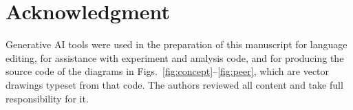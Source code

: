 \documentclass[lettersize,journal]{IEEEtran}
\begin{document}
\section*{Acknowledgment}
Generative AI tools were used in the preparation of this manuscript for language editing, for assistance with experiment and analysis code, and for producing the source code of the diagrams in Figs.~\ref{fig:concept}--\ref{fig:peer}, which are vector drawings typeset from that code. The authors reviewed all content and take full responsibility for it.



\end{document}
